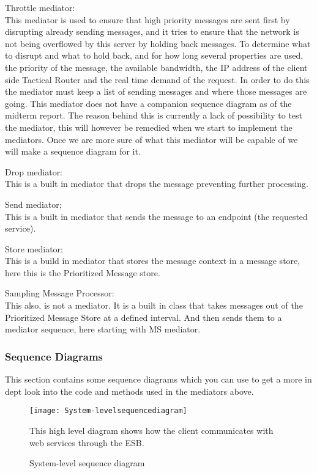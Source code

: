     Throttle mediator:\\
    This mediator is used to ensure that high priority messages are sent first by disrupting already sending messages, and it tries to ensure that the network is not being overflowed by this server by holding back messages. To determine what to disrupt and what to hold back, and for how long several properties are used, the priority of the message, the available bandwidth, the IP address of the client side Tactical Router and the real time demand of the request. In order to do this the mediator must keep a list of sending messages and where those messages are going. This mediator does not have a companion sequence diagram as of the midterm report. The reason behind this is currently a lack of possibility to test the mediator, this will however be remedied when we start to implement the mediators. Once we are more sure of what this mediator will be capable of we will make a sequence diagram for it.

    \label{Built in Mediators}
    Drop mediator:\\
    This is a built in mediator that drops the message preventing further processing.

    Send mediator;\\
    This is a built in mediator that sends the message to an endpoint (the requested service).

    Store mediator:\\
    This is a build in mediator that stores the message context in a message store, here this is the Prioritized Message store.

    Sampling Message Processor:\\
    This also, is not a mediator. It is a built in class that takes messages out of the Prioritized Message Store at a defined interval. And then sends them to a mediator sequence, here starting with MS mediator.

    \subsubsection{Sequence Diagrams}\label{Server Sequence Diagrams}
    This section contains some sequence diagrams which you can use to get a more in dept look into the code and methods used in the mediators above.
    
        \begin{figure}[h]
            \centering
            \texttt{[image: System-levelsequencediagram]}
            \caption{System-level sequence diagram}
            This high level diagram shows how the client communicates with web services through the ESB.
            \label{fig:System-levelsequencediagram}
        \end{figure}
        
